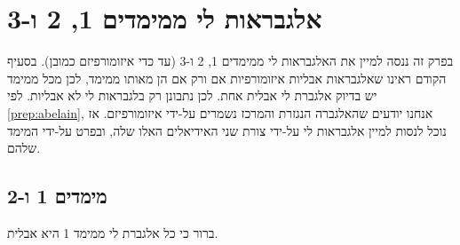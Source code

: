 \documentclass{report}
\theoremstyle{break}
\theoremstyle{MyNonumberbreak}
\begin{document}
\chapter{אלגבראות לי ממימדים 1, 2 ו-3}
בפרק זה ננסה למיין את האלגבראות לי ממימדים 1, 2 ו-3 (עד כדי איזומורפיזם כמובן). בסעיף הקודם ראינו שאלגבראות אבליות איזומורפיות אם ורק אם הן מאותו ממימד, לכן מכל ממימד יש בדיוק אלגברת לי אבלית אחת. לכן נתבונן רק בלגבראות לי לא אבליות. לפי \autoref*{prep:abelain}, אנחנו יודעים שהאלגברה הנגזרת והמרכז נשמרים על-ידי איזומורפיזם. אז נוכל לנסות למיין אלגבראות לי על-ידי צורת שני האידיאלים האלו שלה, ובפרט על-ידי המימד שלהם.
\section{מימדים 1 ו-2}
ברור כי כל אלגברת לי ממימד 1 היא אבלית.
\end{document}
